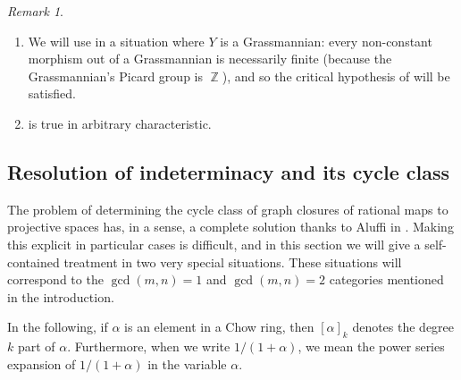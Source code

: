 \documentclass[reqno, 11pt]{amsart}
\theoremstyle{plain}
\theoremstyle{remark}
\newtheorem{remark}[theorem]{Remark}
\DeclareMathOperator{\Z}{\mathbb{Z}}
\begin{document}
    \begin{remark}
        \label{remark:grassmannian}
        \begin{enumerate}
            \item We will use  in a situation where $Y$ is a Grassmannian: every non-constant morphism out of a Grassmannian is necessarily finite (because the Grassmannian's Picard group is $\Z$), and so the critical hypothesis of  will be satisfied.    
            \item {} is true in arbitrary characteristic. 
        \end{enumerate}
    \end{remark}
    

    \subsection{Resolution of indeterminacy and its cycle class}
    \label{subsection:resolution}

    The problem of determining the cycle class of graph closures of rational maps to projective spaces has, in a sense, a complete solution thanks to Aluffi in \cite[~Section 2]{aluffi2015multidegrees}.  Making this explicit in particular cases is difficult, and in this section we will give a self-contained treatment in two very special situations.  These situations will correspond to the $\gcd(m,n) = 1$ and $\gcd(m,n) = 2$ categories mentioned in the introduction. 

    In the following, if $\alpha$ is an element in a Chow ring, then $[\alpha]_{k}$ denotes the degree $k$ part of $\alpha$.  Furthermore, when we write $1/(1+\alpha)$, we mean the power series expansion of $1/(1+\alpha)$ in the variable $\alpha$.
\end{document}
